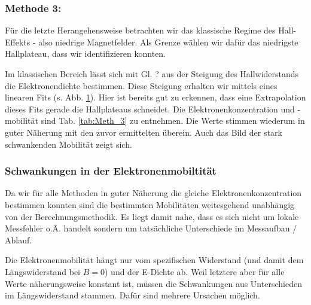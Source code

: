 \begin{table}[h!]
	\centering
	\caption{}
	
	\label{tab:P07_Meth_2}
\end{table}

\begin{table}[h!]
	\centering
	\caption{}
	
	\label{tab:Meth_2}
\end{table}
\newpage
\subsubsection{Methode 3:}
Für die letzte Herangehensweise betrachten wir das klassische Regime des Hall-Effekts - also niedrige Magnetfelder. Als Grenze wählen wir dafür das niedrigste Hallplateau, dass wir identifizieren konnten.

Im klassischen Bereich lässt sich mit Gl. ? aus der Steigung des Hallwiderstands die Elektronendichte bestimmen. Diese Steigung erhalten wir mittels eines linearen Fits (s. Abb. \ref{abb:P07_Meth_3}). Hier ist bereits gut zu erkennen, dass eine Extrapolation dieses Fits gerade die Hallplateaus schneidet. Die Elektronenkonzentration und -mobilität sind Tab. \ref{tab:Meth_3} zu entnehmen. Die Werte stimmen wiederum in guter Näherung mit den zuvor ermittelten überein. Auch das Bild der stark schwankenden Mobilität zeigt sich.
\begin{figure}[htbp]
	\centering
	
	\caption{}
	\label{abb:P07_Meth_3}
\end{figure}

\begin{table}[h]
	\centering
	\caption{}
	
	\label{tab:Meth_3}
\end{table}

\subsubsection{Schwankungen in der Elektronenmobiltität}
Da wir für alle Methoden in guter Näherung die gleiche Elektronenkonzentration bestimmen konnten sind die bestimmten Mobilitäten weitesgehend unabhängig von der Berechnungsmethodik. Es liegt damit nahe, dass es sich nicht um lokale Messfehler o.Ä. handelt sondern um tatsächliche Unterschiede im Messaufbau / Ablauf. 

Die Elektronenmobilität hängt nur vom spezifischen Widerstand (und damit dem Längswiderstand bei $ B = 0 $) und der E-Dichte ab. Weil letztere aber für alle Werte näherungsweise konstant ist, müssen die Schwankungen aus Unterschieden im Längswiderstand stammen. Dafür sind mehrere Ursachen möglich. 

